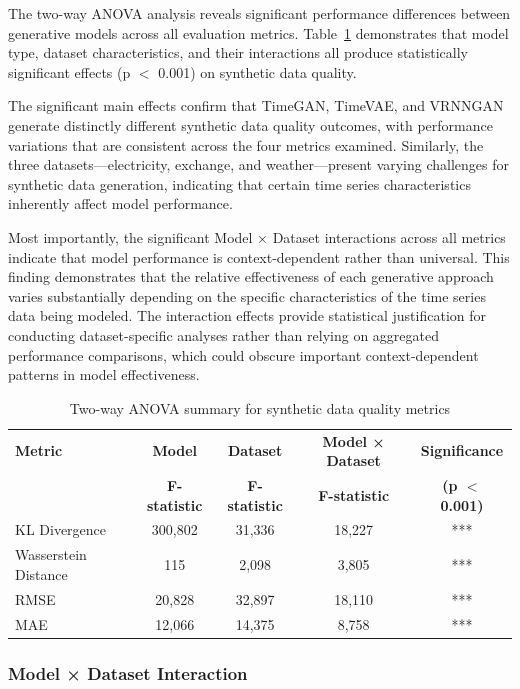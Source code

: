\documentclass{article}
\begin{document}
The two-way ANOVA analysis reveals significant performance differences between generative models across all evaluation metrics. Table~\ref{tab:anova_summary} demonstrates that model type, dataset characteristics, and their interactions all produce statistically significant effects (p $<$ 0.001) on synthetic data quality.

The significant main effects confirm that TimeGAN, TimeVAE, and VRNNGAN generate distinctly different synthetic data quality outcomes, with performance variations that are consistent across the four metrics examined. Similarly, the three datasets—electricity, exchange, and weather—present varying challenges for synthetic data generation, indicating that certain time series characteristics inherently affect model performance.

Most importantly, the significant Model × Dataset interactions across all metrics indicate that model performance is context-dependent rather than universal. This finding demonstrates that the relative effectiveness of each generative approach varies substantially depending on the specific characteristics of the time series data being modeled. The interaction effects provide statistical justification for conducting dataset-specific analyses rather than relying on aggregated performance comparisons, which could obscure important context-dependent patterns in model effectiveness.

\begin{table}[H]
\centering
\caption{Two-way ANOVA summary for synthetic data quality metrics}
\label{tab:anova_summary}
\begin{tabular}{lcccc}
\toprule
\textbf{Metric} & \textbf{Model} & \textbf{Dataset} & \textbf{Model × Dataset} & \textbf{Significance} \\
 & \textbf{F-statistic} & \textbf{F-statistic} & \textbf{F-statistic} & \textbf{(p $<$ 0.001)} \\
\midrule
KL Divergence & 300,802 & 31,336 & 18,227 & *** \\
Wasserstein Distance & 115 & 2,098 & 3,805 & *** \\
RMSE & 20,828 & 32,897 & 18,110 & *** \\
MAE & 12,066 & 14,375 & 8,758 & *** \\
\bottomrule
\end{tabular}
\end{table}



\subsubsection{Model × Dataset Interaction}
\end{document}
